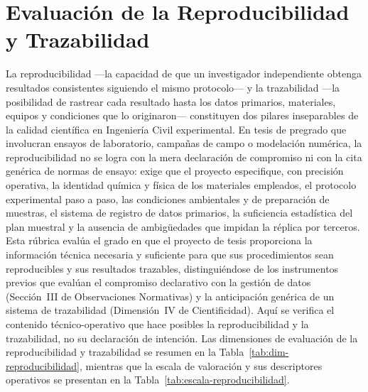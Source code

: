 \clearpage
\section{Evaluación de la Reproducibilidad y Trazabilidad}

{\footnotesize
La reproducibilidad ---la capacidad de que un investigador independiente obtenga resultados consistentes siguiendo el mismo protocolo--- y la trazabilidad ---la posibilidad de rastrear cada resultado hasta los datos primarios, materiales, equipos y condiciones que lo originaron--- constituyen dos pilares inseparables de la calidad científica en Ingeniería Civil experimental. En tesis de pregrado que involucran ensayos de laboratorio, campañas de campo o modelación numérica, la reproducibilidad no se logra con la mera declaración de compromiso ni con la cita genérica de normas de ensayo: exige que el proyecto especifique, con precisión operativa, la identidad química y física de los materiales empleados, el protocolo experimental paso a paso, las condiciones ambientales y de preparación de muestras, el sistema de registro de datos primarios, la suficiencia estadística del plan muestral y la ausencia de ambigüedades que impidan la réplica por terceros. Esta rúbrica evalúa el grado en que el proyecto de tesis proporciona la información técnica necesaria y suficiente para que sus procedimientos sean reproducibles y sus resultados trazables, distinguiéndose de los instrumentos previos que evalúan el compromiso declarativo con la gestión de datos (Sección~III de Observaciones Normativas) y la anticipación genérica de un sistema de trazabilidad (Dimensión~IV de Cientificidad). Aquí se verifica el contenido técnico-operativo que hace posibles la reproducibilidad y la trazabilidad, no su declaración de intención. Las dimensiones de evaluación de la reproducibilidad y trazabilidad se resumen en la Tabla~\ref{tab:dim-reproducibilidad}, mientras que la escala de valoración y sus descriptores operativos se presentan en la Tabla~\ref{tab:escala-reproducibilidad}.\par
}

